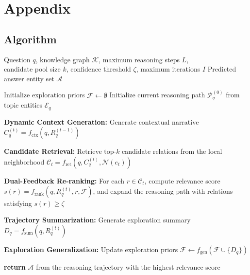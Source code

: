 \onecolumn
\section{Appendix}

\subsection{Algorithm}\label{sec:algorithm}

\begin{algorithm}[h]
    \caption{Trajectory-aware Reasoning with Adaptive Context and Exploration Priors (\method{})}
    \renewcommand{\algorithmicrequire}{\textbf{Input:}}
    \renewcommand{\algorithmicensure}{\textbf{Output:}}
    \begin{algorithmic}[1]
        \REQUIRE Question $q$, knowledge graph $\mathcal{K}$, 
        maximum reasoning steps $L$, \\ candidate pool size $k$, confidence threshold $\zeta$, 
        maximum iterations $I$
        \ENSURE Predicted answer entity set $\mathcal{A}$

        \STATE Initialize exploration priors $\mathcal{F} \leftarrow \emptyset$
        \STATE Initialize current reasoning path $\mathcal{P}_q^{(0)}$ from topic entities $\mathcal{E}_q$
        
                \STATE \textbf{Dynamic Context Generation:}  
                Generate contextual narrative  
                $C_q^{(t)} = f_{\text{ctx}}(q, R_q^{(t-1)})$

                \STATE \textbf{Candidate Retrieval:}  
                Retrieve top-$k$ candidate relations from the local neighborhood  
                $\mathcal{C}_t = f_{\text{ret}}(q, C_q^{(t)}, \mathcal{N}(e_t))$

                \STATE \textbf{Dual-Feedback Re-ranking:}  
                For each $r \in \mathcal{C}_t$, compute relevance score  
                $s(r) = f_{\text{rank}}(q, R_q^{(t)}, r, \mathcal{F})$,  
                and expand the reasoning path with relations satisfying $s(r) \geq \zeta$
            \ENDFOR

                \STATE \textbf{Trajectory Summarization:}  
                Generate exploration summary  
                $D_q = f_{\text{sum}}(q, R_q^{(t)})$

                \STATE \textbf{Exploration Generalization:}  
                Update exploration priors  
                $\mathcal{F} \leftarrow f_{\text{gen}}(\mathcal{F} \cup \{D_q\})$
            \ENDIF
        \ENDFOR

        \STATE \textbf{return} $\mathcal{A}$ from the reasoning trajectory with the highest relevance score
    \end{algorithmic}
\end{algorithm}




